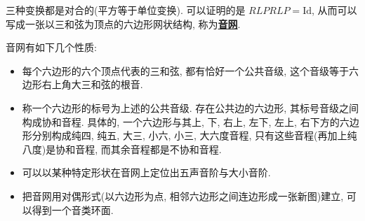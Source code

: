 \documentclass[8pt]{article}
\theoremstyle{compact}
\def\obj#1{\textbf{\uline{#1}}}
\begin{document}
三种变换都是对合的(平方等于单位变换). 可以证明的是 $RLPRLP = \text{Id}$, 从而可以写成一张以三和弦为顶点的六边形网状结构, 称为\obj{音网}.

音网有如下几个性质: \begin{itemize}
	\item 每个六边形的六个顶点代表的三和弦, 都有恰好一个公共音级, 这个音级等于六边形右上角大三和弦的根音.
 \item 称一个六边形的标号为上述的公共音级. 存在公共边的六边形, 其标号音级之间构成协和音程. 具体的, 一个六边形与其上, 下, 右上, 左下, 左上, 右下方的六边形分别构成纯四, 纯五, 大三, 小六, 小三, 大六度音程, 只有这些音程(再加上纯八度)是协和音程, 而其余音程都是不协和音程.
 \item 可以以某种特定形状在音网上定位出五声音阶与大小音阶.
 \item 把音网用对偶形式(以六边形为点, 相邻六边形之间连边形成一张新图)建立, 可以得到一个音类环面.
\end{itemize}
\end{document}

